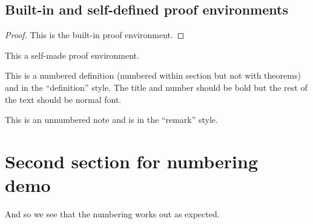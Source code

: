 \subsection{Built-in and self-defined proof environments}

\begin{proof}
This is the built-in proof environment.
\end{proof}

\begin{ProofOri}
This a self-made proof environment.
\end{ProofOri}

\begin{definition}
This is a numbered definition (numbered within section but not with theorems) and in the ``definition'' style. The title and number should be bold but the rest of the text should be normal font.
\end{definition}

\begin{note}
This is an unnumbered note and is in the ``remark'' style.
\end{note}

\section{Second section for numbering demo}

\begin{theorem}
And so we see that the numbering works out as expected.
\end{theorem}


